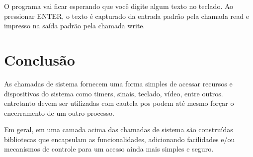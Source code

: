 O programa vai ficar esperando que você digite algum texto no teclado. Ao pressionar ENTER, o texto é capturado da entrada padrão pela chamada read e impresso na saída padrão pela chamada write.

\section{Conclusão}

As chamadas de sistema fornecem uma forma simples de acessar recursos e dispositivos do sistema como timers, sinais, teclado, vídeo, entre outros. entretanto devem ser utilizadas com cautela pos podem até mesmo forçar o encerramento de um outro processo.

Em geral, em uma camada acima das chamadas de sistema são construídas bibliotecas que encapsulam as funcionalidades, adicionando facilidades e/ou mecanismos de controle para um acesso ainda mais simples e seguro.